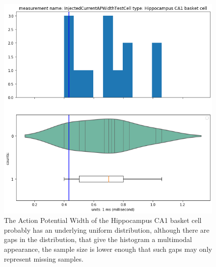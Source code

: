 \begin{figure} 
    \begin{center}

   \includegraphics[scale=0.45]{notebooks_converted/needata_thesis_files/needata_thesis_5_9}
   \caption{The Action Potential Width of the Hippocampus CA1 basket cell probably has an underlying uniform distribution, although there are gaps in the distribution, that give the histogram a multimodal appearance, the sample size is lower enough that such gaps may only represent missing samples.}
    \end{center}

\end{figure}
    { \hspace*{\fill} \\}

